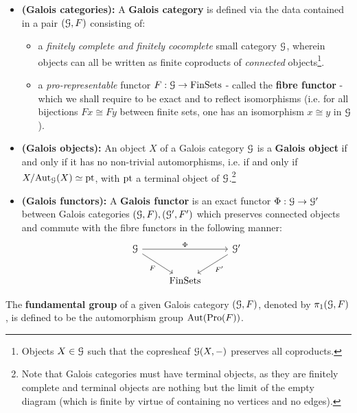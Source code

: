             \begin{definition} \label{def: galois_categories}
                \noindent
                \begin{itemize}
                    \item \textbf{(Galois categories):} A \textbf{Galois category} is defined via the data contained in a pair $(\mathcal{G}, F)$ consisting of:
                    \begin{itemize}
                        \item a \textit{finitely complete and finitely cocomplete} small category $\mathcal{G}$, wherein objects can all be written as finite coproducts of \textit{connected} objects\footnote{Objects $X \in \mathcal{G}$ such that the copresheaf $\mathcal{G}(X, -)$ preserves all coproducts.}.
                        \item a \textit{pro-representable} functor $F: \mathcal{G} \to \mathrm{Fin}\mathrm{Sets}$ - called the \textbf{fibre functor} - which we shall require to be exact and to reflect isomorphisms (i.e. for all bijections $Fx \cong Fy$ between finite sets, one has an isomorphism $x \cong y$ in $\mathcal{G}$).
                    \end{itemize}
                    \item \textbf{(Galois objects):} An object $X$ of a Galois category $\mathcal{G}$ is a \textbf{Galois object} if and only if it has no non-trivial automorphisms, i.e. if and only if $X/\mathrm{Aut}_{\mathcal{G}}(X) \simeq \mathrm{pt}$, with $\mathrm{pt}$ a terminal object of $\mathcal{G}$.\footnote{Note that Galois categories must have terminal objects, as they are finitely complete and terminal objects are nothing but the limit of the empty diagram (which is finite by virtue of containing no vertices and no edges).}
                    \item \textbf{(Galois functors):} A \textbf{Galois functor} is an exact functor $\Phi: \mathcal{G} \to \mathcal{G}'$ between Galois categories $(\mathcal{G}, F), (\mathcal{G}', F')$ which preserves connected objects and commute with the fibre functors in the following manner:
                        $$
                            \begin{tikzcd}
                            	\calG && {\calG'} \\
                            	& {\Fin\Sets}
                            	\arrow["F"', from=1-1, to=2-2]
                            	\arrow["{F'}", from=1-3, to=2-2]
                            	\arrow["\Phi", from=1-1, to=1-3]
                            \end{tikzcd}
                        $$
                \end{itemize}
            \end{definition}
            \begin{definition} \label{def: fundamental_groups_of_galois_categories}
                The \textbf{fundamental group} of a given Galois category $(\mathcal{G}, F)$, denoted by $\pi_1(\mathcal{G}, F)$, is defined to be the automorphism group $\mathrm{Aut}(\mathrm{Pro}(F))$.
            \end{definition}
            
